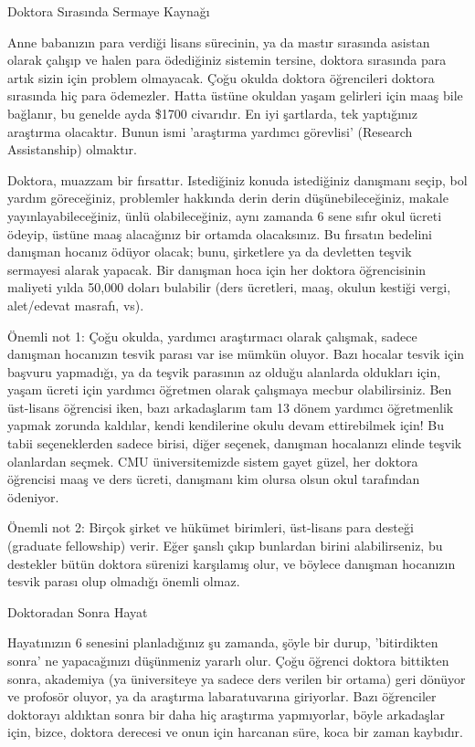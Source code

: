 \documentclass[12pt,fleqn]{article}\usepackage{../../common}
\begin{document}
Doktora Sırasında Sermaye Kaynağı

Anne babanızın para verdiği lisans sürecinin, ya da mastır sırasında
asistan olarak çalışıp ve halen para ödediğiniz sistemin tersine, doktora
sırasında para artık sizin için problem olmayacak. Çoğu okulda doktora
öğrencileri doktora sırasında hiç para ödemezler. Hatta üstüne okuldan
yaşam gelirleri için maaş bile bağlanır, bu genelde ayda \$1700
civarıdır. En iyi şartlarda, tek yaptığınız araştırma olacaktır. Bunun ismi
'araştırma yardımcı görevlisi' (Research Assistanship) olmaktır.

Doktora, muazzam bir fırsattır. Istediğiniz konuda istediğiniz danışmanı
seçip, bol yardım göreceğiniz, problemler hakkında derin derin
düşünebileceğiniz, makale yayınlayabileceğiniz, ünlü olabileceğiniz, aynı
zamanda 6 sene sıfır okul ücreti ödeyip, üstüne maaş alacağınız bir ortamda
olacaksınız. Bu fırsatın bedelini danışman hocanız ödüyor olacak; bunu,
şirketlere ya da devletten teşvik sermayesi alarak yapacak. Bir danışman
hoca için her doktora öğrencisinin maliyeti yılda 50,000 doları bulabilir
(ders ücretleri, maaş, okulun kestiği vergi, alet/edevat masrafı, vs).

Önemli not 1: Çoğu okulda, yardımcı araştırmacı olarak çalışmak, sadece
danışman hocanızın tesvik parası var ise mümkün oluyor. Bazı hocalar tesvik
için başvuru yapmadığı, ya da teşvik parasının az olduğu alanlarda
oldukları için, yaşam ücreti için yardımcı öğretmen olarak çalışmaya mecbur
olabilirsiniz. Ben üst-lisans öğrencisi iken, bazı arkadaşlarım tam 13
dönem yardımcı öğretmenlik yapmak zorunda kaldılar, kendi kendilerine okulu
devam ettirebilmek için! Bu tabii seçeneklerden sadece birisi, diğer
seçenek, danışman hocalanızı elinde teşvik olanlardan seçmek. CMU
üniversitemizde sistem gayet güzel, her doktora öğrencisi maaş ve ders
ücreti, danışmanı kim olursa olsun okul tarafından ödeniyor.

Önemli not 2: Birçok şirket ve hükümet birimleri, üst-lisans para desteği
(graduate fellowship) verir. Eğer şanslı çıkıp bunlardan birini
alabilirseniz, bu destekler bütün doktora sürenizi karşılamış olur, ve
böylece danışman hocanızın tesvik parası olup olmadığı önemli olmaz.

Doktoradan Sonra Hayat

Hayatınızın 6 senesini planladığınız şu zamanda, şöyle bir durup,
'bitirdikten sonra' ne yapacağınızı düşünmeniz yararlı olur. Çoğu öğrenci
doktora bittikten sonra, akademiya (ya üniversiteye ya sadece ders verilen
bir ortama) geri dönüyor ve profosör oluyor, ya da araştırma labaratuvarına
giriyorlar. Bazı öğrenciler doktorayı aldıktan sonra bir daha hiç araştırma
yapmıyorlar, böyle arkadaşlar için, bizce, doktora derecesi ve onun için
harcanan süre, koca bir zaman kaybıdır.
\end{document}
